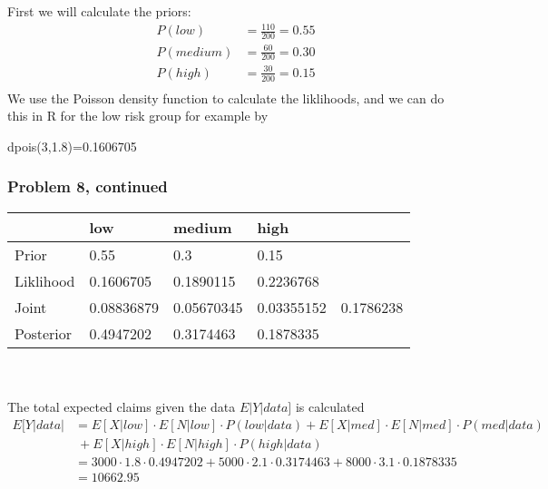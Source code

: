 \documentclass[12pt]{article}
\theoremstyle{definition}
\begin{document}
First we will calculate the priors:
\begin{align*}
P(low) &= \frac{110}{200} = 0.55\\
P(medium) &= \frac{60}{200} = 0.30\\
P(high) &= \frac{30}{200} = 0.15\\
\end{align*}
We use the Poisson density function to calculate the liklihoods, and we can do this in R for the low risk group for example by
\begin{verbatim*}
dpois(3,1.8)=0.1606705
\end{verbatim*}

\newpage
\subsubsection*{Problem 8, continued}
\begin{tabular}{lllll}
&   low   &   medium   &   high   \\
\hline
Prior      &   0.55   &   0.3   &   0.15   &\\
Liklihood  &   0.1606705   &   0.1890115   &   0.2236768   &\\
Joint      &   0.08836879   &   0.05670345   &   0.03355152   &   0.1786238\\
Posterior  &   0.4947202   &   0.3174463   &   0.1878335   &\\
\hline
\end{tabular}
\\\\
The total expected claims given the data $E|Y|data]$ is calculated
\begin{align*}
E[Y|data| &= E[X|low] \cdot E[N|low] \cdot P(low|data) + E[X|med] \cdot E[N|med] \cdot P(med|data)\\
&\ + E[X|high] \cdot E[N|high] \cdot P(high|data)\\
&= 3000 \cdot 1.8 \cdot 0.4947202 + 5000 \cdot 2.1 \cdot 0.3174463 + 8000 \cdot 3.1 \cdot 0.1878335\\
&= 10662.95
\end{align*}
\end{document}
